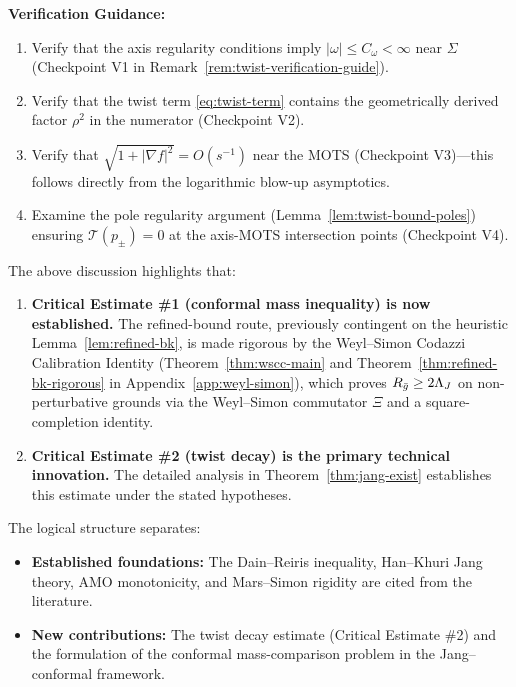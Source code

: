 \textbf{Verification Guidance:}
\begin{enumerate}[label=(\roman*)]
\item Verify that the axis regularity conditions imply $|\omega| \leq C_\omega < \infty$ near $\Sigma$ (Checkpoint V1 in Remark~\ref{rem:twist-verification-guide}).
\item Verify that the twist term \eqref{eq:twist-term} contains the geometrically derived factor $\rho^2$ in the numerator (Checkpoint V2).
\item Verify that $\sqrt{1 + |\nabla f|^2} = O(s^{-1})$ near the MOTS (Checkpoint V3)---this follows directly from the logarithmic blow-up asymptotics.
\item Examine the pole regularity argument (Lemma~\ref{lem:twist-bound-poles}) ensuring $\mathcal{T}(p_\pm) = 0$ at the axis-MOTS intersection points (Checkpoint V4).
\end{enumerate}
\begin{remark}\label{rem:proof-robustness}
The above discussion highlights that:
\begin{enumerate}
\item \textbf{Critical Estimate \#1 (conformal mass inequality) is now established.} The refined-bound route, previously contingent on the heuristic Lemma~\ref{lem:refined-bk}, is made rigorous by the Weyl--Simon Codazzi Calibration Identity (Theorem~\ref{thm:wscc-main} and Theorem~\ref{thm:refined-bk-rigorous} in Appendix~\ref{app:weyl-simon}), which proves $R_{\bar{g}}\geq 2\Lambda_J$ on non-perturbative grounds via the Weyl--Simon commutator $\Xi$ and a square-completion identity.
\item \textbf{Critical Estimate \#2 (twist decay) is the primary technical innovation.} The detailed analysis in Theorem~\ref{thm:jang-exist} establishes this estimate under the stated hypotheses.
\end{enumerate}

The logical structure separates:
\begin{itemize}
\item \textbf{Established foundations:} The Dain--Reiris inequality, Han--Khuri Jang theory, AMO monotonicity, and Mars--Simon rigidity are cited from the literature.
\item \textbf{New contributions:} The twist decay estimate (Critical Estimate \#2) and the formulation of the conformal mass-comparison problem in the Jang--conformal framework.
\end{itemize}
\end{remark}

